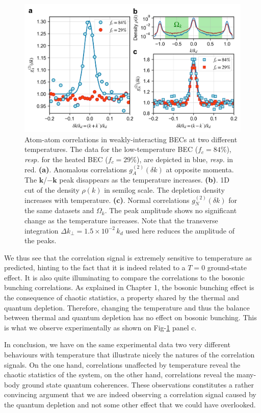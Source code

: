 \begin{figure}
    \centering
    \includegraphics[width=\textwidth]{Fig/Chapter4/kmk_temperature.png}
    \caption{Atom-atom correlations in weakly-interacting BECs at two different temperatures. The data for the low-temperature BEC ($f_{c}=84\%$), {\it resp.} for the heated BEC ($f_{c}=29\%$), are depicted in blue, {\it resp.} in red. 
    {\bf (a)}. Anomalous correlations $g_{A}^{(2)}(\delta k)$ at opposite momenta. The ${\bm k}$/$-{\bm k}$ peak disappears as the temperature increases.
    {\bf (b)}. 1D cut of the density $\rho(k)$ in semilog scale. The depletion density increases with temperature.
    {\bf (c)}. Normal correlations $g_{N}^{(2)}(\delta k)$ for the same datasets and $\Omega_k$. The peak amplitude shows no significant change as the temperature increases. Note that the transverse integration $\Delta k_{\perp}=1.5 \times 10^{-2} \, k_d$ used here reduces the amplitude of the peaks.}
    \label{fig:kmk_temperature}
\end{figure}

We thus see that the \kmk correlation signal is extremely sensitive to temperature as predicted, hinting to the fact that it is indeed related to a $T=0$ ground-state effect. It is also quite illuminating to compare the \kmk correlations to the bosonic bunching \kk correlations. As explained in Chapter 1, the bosonic bunching effect is the consequence of chaotic statistics, a property shared by the thermal and quantum depletion. Therefore, changing the temperature and thus the balance between thermal and quantum depletion has no effect on bosonic bunching. This is what we observe experimentally as shown on Fig-\ref{fig:kmk_temperature} panel c.

In conclusion, we have on the same experimental data two very different behaviours with temperature that illustrate nicely the natures of the correlation signals. On the one hand, \kk correlations unaffected by temperature reveal the chaotic statistics of the system, on the other hand, \kmk correlations reveal the many-body ground state quantum coherences. These observations constitutes a rather convincing argument that we are indeed observing a \kmk correlation signal caused by the quantum depletion and not some other effect that we could have overlooked.

